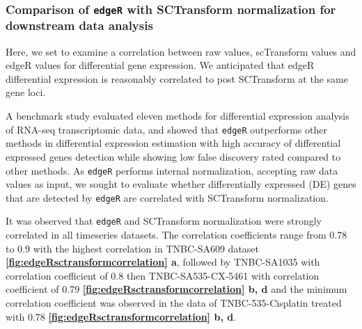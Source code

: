 \subsubsection{Comparison of \texttt{edgeR} with SCTransform normalization for downstream data analysis}
Here, we set to examine a correlation between raw values, scTransform values and edgeR values for differential gene expression. We anticipated that edgeR differential expression is reasonably correlated to post SCTransform at the same gene loci.

A benchmark study evaluated eleven methods \cite{soneson2013comparison} for differential expression analysis of RNA-seq transcriptomic data, and showed that \texttt{edgeR} outperforms other methods in differential expression estimation with high accuracy of differential expressed genes detection while showing low false discovery rated compared to other methods. As \texttt{edgeR} performs internal normalization, accepting raw data values as input, we sought to evaluate whether differentially expressed (DE) genes that are detected by \texttt{edgeR} are correlated with SCTransform normalization.

It was observed that \texttt{edgeR} and SCTransform normalization were strongly correlated in all timeseries datasets. The correlation coefficients range from 0.78 to 0.9 with the highest correlation in TNBC-SA609 dataset  \textbf{\autoref{fig:edgeRsctransformcorrelation} a}, followed by TNBC-SA1035 with correlation coefficient of 0.8 then TNBC-SA535-CX-5461 with correlation coefficient of 0.79  \textbf{\autoref{fig:edgeRsctransformcorrelation} b, d} and the minimum correlation coefficient was observed in the data of TNBC-535-Cisplatin treated with  0.78 \textbf{\autoref{fig:edgeRsctransformcorrelation} b, d}.






